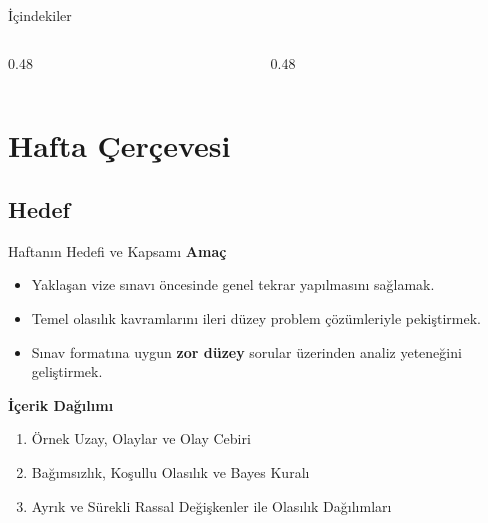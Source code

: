 \documentclass[light]{lutbeamer}
\begin{document}
\begin{frame}{İçindekiler}
  \scriptsize
  \begin{columns}[T]
    \begin{column}{0.48\textwidth}
      \tableofcontents[sections={1-3}]
    \end{column}
    \begin{column}{0.48\textwidth}
      \tableofcontents[sections={4-7}]
    \end{column}
  \end{columns}
\end{frame}

\section{Hafta Çerçevesi}
\subsection{Hedef}

\begin{frame}[t]{Haftanın Hedefi ve Kapsamı}
\textbf{Amaç}
\begin{itemize}
  \item Yaklaşan vize sınavı öncesinde genel tekrar yapılmasını sağlamak.
  \item Temel olasılık kavramlarını ileri düzey problem çözümleriyle pekiştirmek.
  \item Sınav formatına uygun \textbf{zor düzey} sorular üzerinden analiz yeteneğini geliştirmek.
\end{itemize}

\vspace{0.4em}
\textbf{İçerik Dağılımı}
\begin{enumerate}
    \item Örnek Uzay, Olaylar ve Olay Cebiri
    \item Bağımsızlık, Koşullu Olasılık ve Bayes Kuralı
    \item Ayrık ve Sürekli Rassal Değişkenler ile Olasılık Dağılımları
\end{enumerate}
\end{frame}
\end{document}

